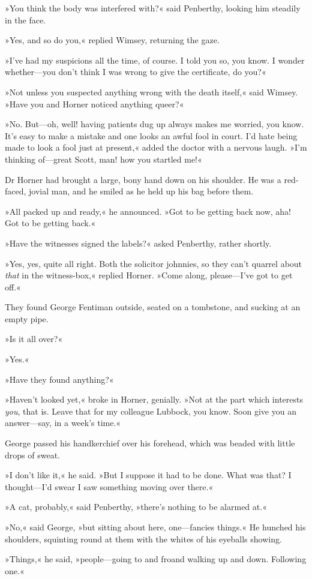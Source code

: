 »You think the body was interfered with?« said Penberthy, looking him steadily in the face.

»Yes, and so do you,« replied Wimsey, returning the gaze.

»I've had my suspicions all the time, of course. I told you so, you know. I wonder whether—you don't think I was wrong to give the certificate, do you?«

»Not unless you suspected anything wrong with the death itself,« said Wimsey. »Have you and Horner noticed anything queer?«

»No. But—oh, well! having patients dug up always makes me worried, you know. It's easy to make a mistake and one looks an awful fool in court. I'd hate being made to look a fool just at present,« added the doctor with a nervous laugh. »I'm thinking of—great Scott, man! how you startled me!«

Dr Horner had brought a large, bony hand down on his shoulder. He was a red-faced, jovial man, and he smiled as he held up his bag before them.

»All packed up and ready,« he announced. »Got to be getting back now, aha! Got to be getting back.«

»Have the witnesses signed the labels?« asked Penberthy, rather shortly.

»Yes, yes, quite all right. Both the solicitor johnnies, so they can't quarrel about \textit{that} in the witness-box,« replied Horner. »Come along, please—I've got to get off.«

They found George Fentiman outside, seated on a tombstone, and sucking at an empty pipe.

»Is it all over?«

»Yes.«

»Have they found anything?«

»Haven't looked yet,« broke in Horner, genially. »Not at the part which interests \textit{you}, that is. Leave that for my colleague Lubbock, you know. Soon give you an answer—say, in a week's time.«

George passed his handkerchief over his forehead, which was beaded with little drops of sweat.

»I don't like it,« he said. »But I suppose it had to be done. What was that? I thought—I'd swear I saw something moving over there.«

»A cat, probably,« said Penberthy, »there's nothing to be alarmed at.«

»No,« said George, »but sitting about here, one—fancies things.« He hunched his shoulders, squinting round at them with the whites of his eyeballs showing.

»Things,« he said, »people—going to and fro\textellipsis  and walking up and down. Following one.«